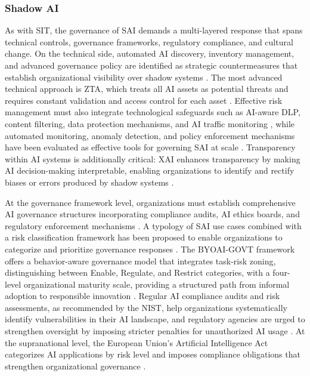 \documentclass[12pt,oneside]{article}
\begin{document}
\subsubsection{Shadow AI}

As with \ac{SIT}, the governance of \ac{SAI} demands a multi-layered response that spans technical controls, governance frameworks, regulatory compliance, and cultural change. On the technical side, automated \ac{AI} discovery, inventory management, and advanced governance policy are identified as strategic countermeasures that establish organizational visibility over shadow systems \citep[973]{puthal2025shadowai}. The most advanced technical approach is \ac{ZTA}, which treats all \ac{AI} assets as potential threats and requires constant validation and access control for each asset \citep[1]{puthal2025shadowai}. Effective risk management must also integrate technological safeguards such as \ac{AI}-aware \ac{DLP}, content filtering, data protection mechanisms, and \ac{AI} traffic monitoring \citep[2]{puthal2025shadowai}, while automated monitoring, anomaly detection, and policy enforcement mechanisms have been evaluated as effective tools for governing \ac{SAI} at scale \citep[1]{whitford2025aidriven}. Transparency within \ac{AI} systems is additionally critical: \ac{XAI} enhances transparency by making \ac{AI} decision-making interpretable, enabling organizations to identify and rectify biases or errors produced by shadow systems \citep[7]{balogun2025ethical}.

At the governance framework level, organizations must establish comprehensive \ac{AI} governance structures incorporating compliance audits, \ac{AI} ethics boards, and regulatory enforcement mechanisms \citep[3]{balogun2025ethical}. A typology of \ac{SAI} use cases combined with a risk classification framework has been proposed to enable organizations to categorize and prioritize governance responses \citep[1]{ross2025shadowai}. The \ac{BYOAI}-GOVT framework offers a behavior-aware governance model that integrates task-risk zoning, distinguishing between Enable, Regulate, and Restrict categories, with a four-level organizational maturity scale, providing a structured path from informal adoption to responsible innovation \citep[2693]{anthuvan2025byoai}. Regular \ac{AI} compliance audits and risk assessments, as recommended by the \ac{NIST}, help organizations systematically identify vulnerabilities in their \ac{AI} landscape, and regulatory agencies are urged to strengthen oversight by imposing stricter penalties for unauthorized \ac{AI} usage \citep[7, 3]{balogun2025ethical}. At the supranational level, the European Union's Artificial Intelligence Act categorizes \ac{AI} applications by risk level and imposes compliance obligations that strengthen organizational governance \citep[7]{balogun2025ethical}.
\end{document}
